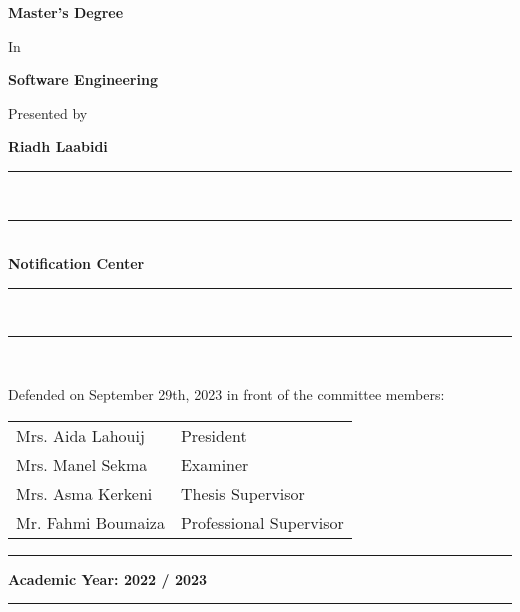 \begin{titlepage}
\begin{center}
        \Large\textbf{Master's Degree}

        \normalsize In

        \Large\textbf{Software Engineering}

        \normalsize Presented by

        \large{\textbf{Riadh Laabidi}}
        \vspace{0.5cm}

        \rule[5pt]{0.5\textwidth}{0.5px}\\
        \vspace{-16px}
        \rule[10pt]{0.5\textwidth}{2.5px} \\
        \LARGE{\textbf{Notification Center}} \\
        \rule[5pt]{0.5\textwidth}{0.5px}\\
        \vspace{-15px}
        \rule[10pt]{0.5\textwidth}{2.5px} \\


        \vspace{1cm}

        \small Defended on September 29th, 2023 in front of the committee members:

        \renewcommand\arraystretch{1}
        \begin{tabular}{m{} l }
            Mrs. Aida Lahouij  & President               \\
            Mrs. Manel Sekma   & Examiner                \\
            Mrs. Asma Kerkeni  & Thesis Supervisor       \\
            Mr. Fahmi Boumaiza & Professional Supervisor
        \end{tabular}
    \end{center}
    \vfill
    \centering
    \rule[0.5px]{30px}{0.5px} \space \footnotesize \textbf{Academic Year: 2022 / 2023} \space \rule[0.5px]{30px}{0.5px}
\end{titlepage}
\cleardoublepage